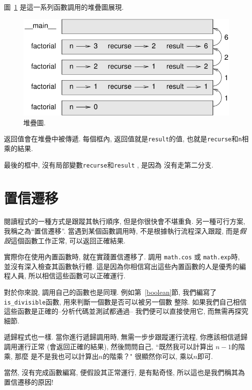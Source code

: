\documentclass[10pt]{book}
\begin{document}
圖~\ref{fig.stack3} 是這一系列函數調用的堆疊圖展現.

\begin{figure}
\centerline
{\includegraphics[scale=0.8]{figs/stack3.pdf}}
\caption{堆疊圖.}
\label{fig.stack3}
\end{figure}

返回值會在堆疊中被傳遞. 
每個框內, 返回值就是{\tt result}的值, 也就是{\tt recurse}和{\tt n}相乘的結果. 

最後的框中, 沒有局部變數{\tt recurse}和{\tt result} , 是因為
沒有走第二分支. 

\section{置信遷移}

閱讀程式的一種方式是跟蹤其執行順序, 但是你很快會不堪重負. 
另一種可行方案, 我稱之為``置信遷移''. 當遇到某個函數調用時, 
不是根據執行流程深入跟蹤, 
而是{\em 假設}這個函數工作正常, 可以返回正確結果. 

實際你在使用內置函數時, 就在實踐置信遷移了. 調用
{\tt math.cos} 或 {\tt math.exp}時, 並沒有深入檢查其函數執行體. 
這是因為你相信寫出這些內置函數的人是優秀的編程人員, 
所以相信這些函數可以正確運行. 

對於你來說, 調用自己的函數也是同理. 例如第~\ref{boolean}節, 
我們編寫了\verb"is_divisible"函數, 用來判斷一個數是否可以被另一個數
整除. 如果我們自己相信這些函數是正確的--分析代碼並測試都通過--
我們便可以直接使用它, 而無需再探究細節. 

遞歸程式也一樣. 當你進行遞歸調用時, 
無需一步步跟蹤運行流程, 你應該相信遞歸調用運行正常
(會返回正確的結果), 然後問問自己, ``既然我可以計算出 $n-1$的階乘, 那麼
是不是我也可以計算出$n$的階乘？" 很顯然你可以, 乘以$n$即可. 

當然, 沒有完成函數編寫, 便假設其正常運行, 是有點奇怪, 
所以這也是我們稱其為置信遷移的原因!
\end{document}
